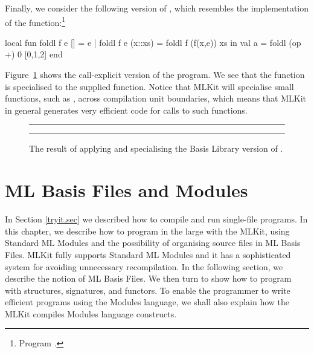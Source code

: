 \documentclass[12pt]{book}
\begin{document}
Finally, we consider the following version of , which resembles the
implementation of the  function:\footnote{Program .}
\begin{smlcode}
  local
    fun foldl f e [] = e
      | foldl f e (x::xs) = foldl f (f(x,e)) xs
  in
    val a = foldl (op +) 0 [0,1,2]
  end
\end{smlcode}
Figure~\ref{fold4.fig} shows the call-explicit version of the program. We see
that the function  is specialised to the supplied function. Notice
that MLKit will specialise small functions, such as , across
compilation unit boundaries, which means that MLKit in general generates very
efficient code for calls to such functions.

\begin{figure}
\hrule \medskip
{}
\caption{The result of applying and specialising the Basis Library version of
  .}  \medskip \hrule
\label{fold4.fig}
\end{figure}


\chapter{ML Basis Files and Modules}
\label{mlb_and_modules.chap}
In Section \ref{tryit.sec} we described how to compile and run single-file
programs. In this chapter, we describe how to program in the large with the
MLKit, using
%
%
%
Standard ML Modules and the possibility of organising source files in ML Basis
Files. MLKit fully supports Standard ML Modules and it has a sophisticated
system for avoiding unnecessary recompilation. In the following section, we
describe the notion of ML Basis Files. We then turn to show how to program with
structures, signatures, and functors.  To enable the programmer to write
efficient programs using the Modules language, we shall also explain how the
MLKit compiles Modules language constructs.
\end{document}
